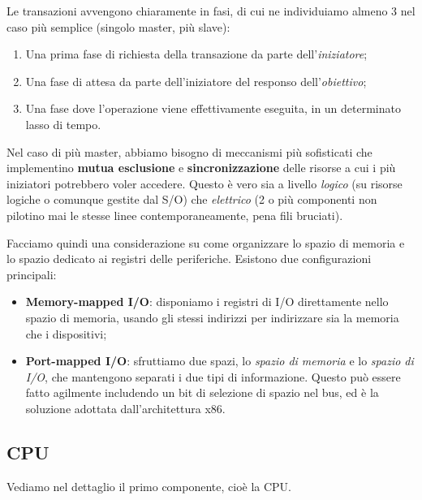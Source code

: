 \documentclass[a4paper,11pt]{article}
\begin{document}
\begin{itemize}
	Le transazioni avvengono chiaramente in fasi, di cui ne individuiamo almeno 3 nel caso più semplice (singolo master, più slave):
	\begin{enumerate}
		\item Una prima fase di richiesta della transazione da parte dell'\textit{iniziatore};
		\item Una fase di attesa da parte dell'iniziatore del responso dell'\textit{obiettivo};
		\item Una fase dove l'operazione viene effettivamente eseguita, in un determinato lasso di tempo.
	\end{enumerate}

	Nel caso di più master, abbiamo bisogno di meccanismi più sofisticati che implementino \textbf{mutua esclusione} e \textbf{sincronizzazione} delle risorse a cui i più iniziatori potrebbero voler accedere.
	Questo è vero sia a livello \textit{logico} (su risorse logiche o comunque gestite dal S/O) che \textit{elettrico} (2 o più componenti non pilotino mai le stesse linee contemporaneamente, pena fili bruciati).

\end{itemize}

Facciamo quindi una considerazione su come organizzare lo spazio di memoria e lo spazio dedicato ai registri delle periferiche.
Esistono due configurazioni principali:
\begin{itemize}
	\item \textbf{Memory-mapped I/O}: disponiamo i registri di I/O direttamente nello spazio di memoria, usando gli stessi indirizzi per indirizzare sia la memoria che i dispositivi;
	\item \textbf{Port-mapped I/O}: sfruttiamo due spazi, lo \textit{spazio di memoria} e lo \textit{spazio di I/O}, che mantengono separati i due tipi di informazione. Questo può essere fatto agilmente includendo un bit di selezione di spazio nel bus, ed è la soluzione adottata dall'architettura x86. 
\end{itemize}

\subsection{CPU}
Vediamo nel dettaglio il primo componente, cioè la CPU. 
\end{document}
